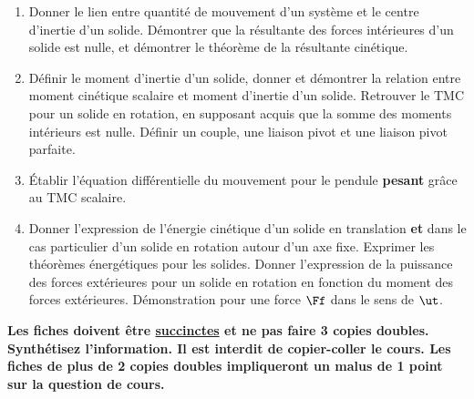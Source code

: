 \documentclass[a4paper, 12pt, final, garamond]{book}
\begin{document}
\begin{enumerate}[label=\sqenumi]
    \item Donner le lien entre quantité de mouvement d'un système et le centre
        d'inertie d'un solide. Démontrer que la résultante des forces
        intérieures d'un solide est nulle, et démontrer le théorème de la
        résultante cinétique.
    \item Définir le moment d'inertie d'un solide, donner et démontrer la
        relation entre moment cinétique scalaire et moment d'inertie d'un
        solide. Retrouver le TMC pour un solide en rotation, en supposant acquis
        que la somme des moments intérieurs est nulle. Définir un couple, une
        liaison pivot et une liaison pivot parfaite.
    \item Établir l'équation différentielle du mouvement pour le pendule
        \textbf{pesant} grâce au TMC scalaire.
    \item Donner l'expression de l'énergie cinétique d'un solide en translation
        \textbf{et} dans le cas particulier d'un solide en rotation autour d'un
        axe fixe. Exprimer les théorèmes énergétiques pour les solides. Donner
        l'expression de la puissance des forces extérieures pour un solide en
        rotation en fonction du moment des forces extérieures. Démonstration
        pour une force $\Ff$ dans le sens de $\ut$.
\end{enumerate}
\vspace{-5pt}

\begin{framed}
    \centering\bfseries\large
    Les fiches doivent être \ul{succinctes} et ne pas faire 3 copies doubles.
    Synthétisez l'information. Il est interdit de copier-coller le cours.
    \bigbreak \Huge
    Les fiches de plus de 2 copies doubles impliqueront un malus de 1 point sur
    la question de cours.
\end{framed}
\end{document}
